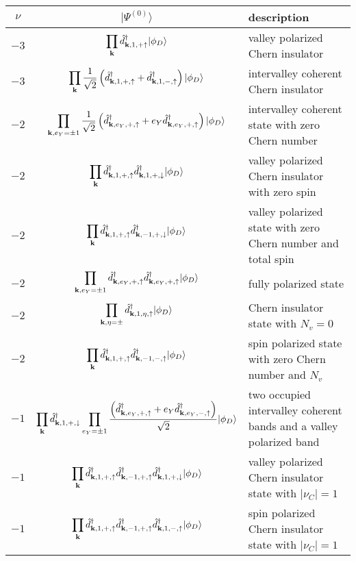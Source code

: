 \documentclass[prb,aps,nofootinbib,amssymb,twocolumn,superscriptaddress,10pt]{revtex4-2}
\begin{document}
\begin{widetext}
\begin{table}[h]
\centering
\begin{tabular}{c||c||l}
\hline
$\nu$ & $|\Psi^{(0)}\rangle$ & description\\
\hline
\hline
$-3$ & $\displaystyle \prod_{\mathbf{k}}\hat{d}^\dagger_{\mathbf{k},1,+\uparrow}|\phi_D\rangle$ & valley polarized Chern insulator\\
\hline
$-3$ & $\displaystyle \prod_{\mathbf{k}}\frac{1}{\sqrt2}\left(\hat{d}^\dagger_{\mathbf{k}, 1,+,\uparrow} + \hat{d}^\dagger_{\mathbf{k}, 1,-,\uparrow}\right)|\phi_D\rangle$ & intervalley coherent Chern insulator\\
\hline
\hline
$-2$ & $\displaystyle \prod_{\mathbf{k},e_Y=\pm1}\frac{1}{\sqrt2}\left(\hat{d}^\dagger_{\mathbf{k},e_Y, +, \uparrow} + e_Y \hat{d}^\dagger_{\mathbf{k},e_Y,+,\uparrow}\right) |\phi_D\rangle$ & intervalley coherent state with zero Chern number\\
\hline
$-2$ & $\displaystyle \prod_{\mathbf{k}}\hat{d}^\dagger_{\mathbf{k},1,+,\uparrow}\hat{d}^\dagger_{\mathbf{k},1,+,\downarrow}|\phi_D\rangle$ & valley polarized Chern insulator with zero spin\\
\hline
$-2$ & $\displaystyle \prod_{\mathbf{k}}\hat{d}^\dagger_{\mathbf{k},1, +, \uparrow}\hat{d}^\dagger_{\mathbf{k}, -1, +, \downarrow} |\phi_D\rangle$ & valley polarized state with zero Chern number and total spin\\
\hline
$-2$ & $\displaystyle \prod_{\mathbf{k},e_Y=\pm1}\hat{d}^\dagger_{\mathbf{k},e_Y, +,\uparrow}\hat{d}^\dagger_{\mathbf{k},e_Y,+,\uparrow} | \phi_D\rangle $ & fully polarized state\\
\hline
$-2$ & $\displaystyle \prod_{\mathbf{k},\eta=\pm}\hat{d}^\dagger_{\mathbf{k},1,\eta,\uparrow}|\phi_D\rangle$ & Chern insulator state with $N_v = 0$\\
\hline
$-2$ & $\displaystyle \prod_{\mathbf{k}}\hat{d}^\dagger_{\mathbf{k},1,+,\uparrow}\hat{d}^\dagger_{\mathbf{k},-1,-,\uparrow}|\phi_D\rangle$ & spin polarized state with zero Chern number and $N_v$\\
\hline
\hline
$-1$ & $\displaystyle \prod_{\mathbf{k}}\hat{d}^\dagger_{\mathbf{k}, 1, +, \downarrow}\prod_{e_Y=\pm1}\frac{\left(\hat{d}^\dagger_{\mathbf{k},e_Y,+,\uparrow} + e_Y \hat{d}^\dagger_{\mathbf{k},e_Y,-,\uparrow}\right)}{\sqrt2} | \phi_D\rangle$ & two occupied intervalley coherent bands and a valley polarized band\\
\hline
$-1$ & $\displaystyle \prod_{\mathbf{k}}\hat{d}^\dagger_{\mathbf{k},1,+,\uparrow}\hat{d}^\dagger_{\mathbf{k},-1,+,\uparrow}\hat{d}^\dagger_{\mathbf{k},1, +, \downarrow}|\phi_D\rangle$ & valley polarized Chern insulator state with $|\nu_C| = 1$\\
\hline
$-1$ & $\displaystyle \prod_{\mathbf{k}} \hat{d}^\dagger_{\mathbf{k},1,+,\uparrow}\hat{d}^\dagger_{\mathbf{k},-1,+,\uparrow}\hat{d}^\dagger_{\mathbf{k},1,-,\uparrow} | \phi_D\rangle$ & spin polarized Chern insulator state with $|\nu_C| = 1$\\

\end{tabular}
\end{table}
\end{widetext}
\end{document}
